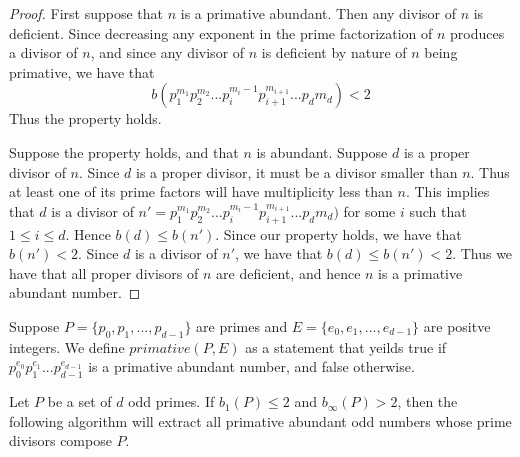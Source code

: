 \documentclass[../paper.tex]{subfiles}
\begin{document}
\begin{proof}
	First suppose that $n$ is a primative abundant. Then any divisor of $n$
is deficient. Since decreasing any exponent in the prime 
factorization of $n$ produces a divisor of $n$, and since any
divisor of $n$ is deficient by nature of $n$ being primative,
we have that 
$$b(p_1^{m_1} p_2^{m_2} ...   p_i^{m_i - 1} p_{i+1}^{m_{i+1}}
... p_d{m_d}) < 2$$
Thus the property holds.

	Suppose the property holds, and that $n$ is abundant. Suppose $d$
is a proper divisor of $n$. Since $d$ is a proper divisor, it must
be a divisor smaller than $n$. Thus at least one of its prime factors
will have multiplicity less than $n$. This implies that $d$ is a 
divisor of
$n' = p_1^{m_1} p_2^{m_2} ...   p_i^{m_i - 1} p_{i+1}^{m_{i+1}}
... p_d{m_d})$ 
for some $i$ such that $1 \leq i \leq d$. Hence $b(d) \leq b(n')$.
Since our property holds, we have that $b(n') < 2$. Since $d$ is
a divisor of $n'$, we have that $b(d) \leq b(n') < 2$. Thus we
have that all proper divisors of $n$ are deficient, and hence $n$ is 
a primative abundant number.
\end{proof}

Suppose $P = \{p_0, p_1, ...,p_{d-1}\}$ are primes and 
$E = \{e_0, e_1, ..., e_{d-1} \}$ are positve integers.
We define $primative(P,E)$ as a statement that yeilds true
if $p_0^{e_0} p_1^{e_1} ... p_{d-1}^{e_{d-1}}$ is a primative
abundant number, and false otherwise.

\begin{theorem} 
Let $P$ be a set of $d$ odd primes. If $b_{1}(P) \leq 2$
and $b_{\infty}(P) > 2$, then the following algorithm will extract all primative
abundant odd numbers whose prime divisors compose $P$.
\end{theorem}
%
%
%
%
%
\end{document}
